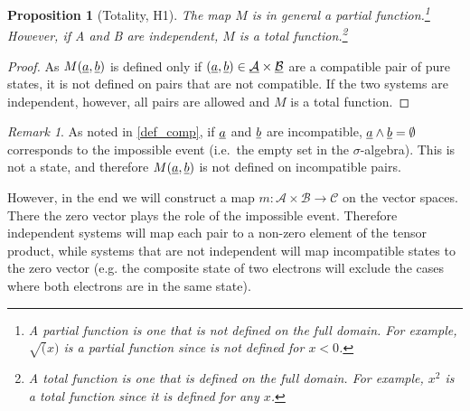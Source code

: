 \documentclass[aps,prl,amsmath,amssymb,twocolumn,nofootinbib]{revtex4}
\theoremstyle{plain}
\newtheorem{prop}[thrm]{Proposition}
\theoremstyle{definition}
\theoremstyle{remark}
\newtheorem*{remark}{Remark}
\newcommand{\pj}[1] {\underbar{$#1$}}
\begin{document}
\begin{prop}[Totality, H1]\label{prop_totality}
  The map $M$ is in general a partial function.\footnote{A partial
    function is one that is not defined on the full domain. For
    example, $\sqrt(x)$ is a partial function since is not defined for
    $x<0$.} However, if A and B are independent, $M$ is a total function.\footnote{A total function is one that is defined on the full domain. For example, $x^2$ is a total function since it is defined for any $x$.}
\end{prop}
\begin{proof}
  As $M(\pj{a},\pj{b})$ is defined only if $(\pj{a},\pj{b}) \in \pj{\mathcal{A}}\times\pj{\mathcal{B}}$ are a compatible pair of pure states, it is not defined on pairs that are not compatible. If the two systems are independent, however, all pairs are allowed and $M$ is a total function.
\end{proof}

\begin{remark}
   As noted in \ref{def_comp}, if $\pj{a}$ and $\pj{b}$ are incompatible, $\pj{a} \wedge \pj{b}=\emptyset$ corresponds to the impossible event (i.e.~the empty set in the $\sigma$-algebra). This is not a state, and therefore $M(\pj{a},\pj{b})$ is not defined on incompatible pairs.
   
   However, in the end we will construct a map $m : \mathcal{A} \times \mathcal{B} \to \mathcal{C}$ on the vector spaces. There the zero vector plays the role of the impossible event. Therefore independent systems will map each pair to a non-zero element of the tensor product, while systems that are not independent will map incompatible states to the zero vector (e.g. the composite state of two electrons will exclude the cases where both electrons are in the same state).
\end{remark}
\end{document}
